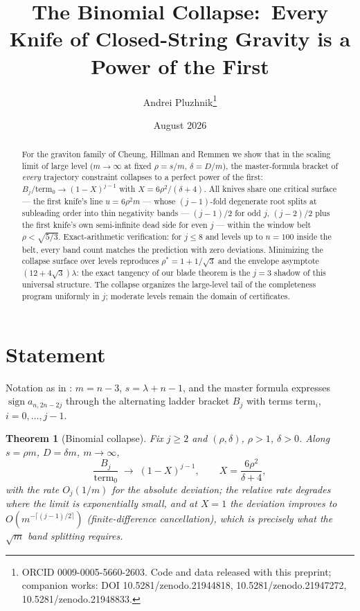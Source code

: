 \documentclass[11pt]{article}
\title{The Binomial Collapse:\ Every Knife of Closed-String Gravity is a Power of the First}
\author{Andrei Pluzhnik\thanks{ORCID 0009-0005-5660-2603. Code and data
released with this preprint; companion works: DOI 10.5281/zenodo.21944818,
10.5281/zenodo.21947272, 10.5281/zenodo.21948833.}}
\date{August 2026}
\newtheorem{theorem}{Theorem}
\begin{document}
\maketitle

\begin{abstract}
For the graviton family of Cheung, Hillman and Remmen we show that in the
scaling limit of large level ($m\to\infty$ at fixed $\rho=s/m$,
$\delta=D/m$), the master-formula bracket of \emph{every} trajectory
constraint collapses to a perfect power of the first:
$B_j/\mathrm{term}_0\to(1-X)^{j-1}$ with $X=6\rho^2/(\delta+4)$. All knives
share one critical surface --- the first knife's line $u=6\rho^2m$ --- whose
$(j{-}1)$-fold degenerate root splits at subleading order into thin
negativity bands --- $(j{-}1)/2$ for odd $j$, $(j{-}2)/2$ plus the first
knife's own semi-infinite dead side for even $j$ --- within the window belt
$\rho<\sqrt{5/3}$. Exact-arithmetic verification: for $j\le8$ and levels up
to $n=100$ inside the belt, every band count matches the prediction with
zero deviations. Minimizing the collapse surface over
levels reproduces $\rho^*=1+1/\sqrt3$ and the envelope asymptote
$(12+4\sqrt3)\lambda$: the exact tangency of our blade theorem is the
$j{=}3$ shadow of this universal structure. The collapse organizes the
large-level tail of the completeness program uniformly in $j$; moderate
levels remain the domain of certificates.
\end{abstract}

\section{Statement}
Notation as in \cite{master}: $m=n-3$, $s=\lambda+n-1$, and the master
formula expresses $\operatorname{sign}a_{n,2n-2j}$ through the alternating
ladder bracket $B_j$ with terms $\mathrm{term}_i$, $i=0,\dots,j-1$.

\begin{theorem}[Binomial collapse]\label{thm:collapse}
Fix $j\ge2$ and $(\rho,\delta)$, $\rho>1$, $\delta>0$. Along
$s=\rho m$, $D=\delta m$, $m\to\infty$,
\begin{equation}
\frac{B_j}{\mathrm{term}_0}\;\longrightarrow\;(1-X)^{j-1},
\qquad X=\frac{6\rho^2}{\delta+4},
\end{equation}
with the rate $O_j(1/m)$ for the absolute deviation; the relative rate
degrades where the limit is exponentially small, and at $X{=}1$ the
deviation improves to $O(m^{-\lceil(j-1)/2\rceil})$ (finite-difference
cancellation), which is precisely what the $\sqrt m$ band splitting
requires.
\end{theorem}
\end{document}
